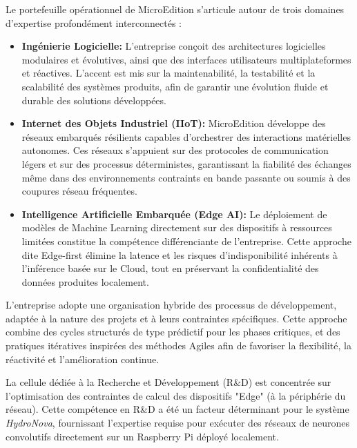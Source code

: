 	
	Le portefeuille opérationnel de MicroEdition s'articule autour de trois domaines d'expertise profondément interconnectés :
	
	\begin{itemize}
		\item \textbf{Ingénierie Logicielle: } L'entreprise conçoit des architectures logicielles modulaires et évolutives, ainsi que des interfaces utilisateurs multiplateformes et réactives. L'accent est mis sur la maintenabilité, la testabilité et la scalabilité des systèmes produits, afin de garantir une évolution fluide et durable des solutions développées.
		
		\item \textbf{Internet des Objets Industriel (IIoT): } MicroEdition développe des réseaux embarqués résilients capables d'orchestrer des interactions matérielles autonomes. Ces réseaux s'appuient sur des protocoles de communication légers et sur des processus déterministes, garantissant la fiabilité des échanges même dans des environnements contraints en bande passante ou soumis à des coupures réseau fréquentes.
		
		\item \textbf{Intelligence Artificielle Embarquée (Edge AI): } Le déploiement de modèles de Machine Learning directement sur des dispositifs à ressources limitées constitue la compétence différenciante de l'entreprise. Cette approche dite Edge-first élimine la latence et les risques d'indisponibilité inhérents à l'inférence basée sur le Cloud, tout en préservant la confidentialité des données produites localement.
	\end{itemize}
	
	L'entreprise adopte une organisation hybride des processus de développement, adaptée à la nature des projets et à leurs contraintes spécifiques. Cette approche combine des cycles structurés de type prédictif pour les phases critiques, et des pratiques itératives inspirées des méthodes Agiles afin de favoriser la flexibilité, la réactivité et l'amélioration continue.
	
	La cellule dédiée à la Recherche et Développement (R\&D) est concentrée sur l'optimisation des contraintes de calcul des dispositifs "Edge" (à la périphérie du réseau). Cette compétence en R\&D a été un facteur déterminant pour le système \textit{HydroNova}, fournissant l'expertise requise pour exécuter des réseaux de neurones convolutifs directement sur un Raspberry Pi déployé localement.
